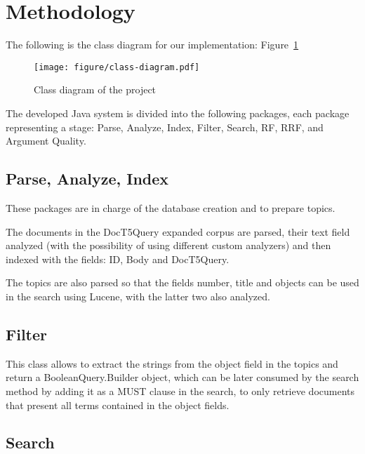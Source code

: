 \section{Methodology}
\label{sec:methodology}


The following is the class diagram for our implementation: Figure~\ref{fig:class-diagram}

\begin{figure}[h]
	\centering
	\texttt{[image: figure/class-diagram.pdf]}
	\caption{Class diagram of the project}
	\label{fig:class-diagram}
\end{figure}

The developed Java system is divided into the following packages, each package representing a stage: Parse, Analyze, Index, Filter, Search, RF, RRF, and Argument Quality.

\subsection{Parse, Analyze, Index}
\label{subsec:parse, analyze, index}
  
  These packages are in charge of the database creation and to prepare topics.
  
  The documents in the DocT5Query expanded corpus are parsed, their text field analyzed (with the possibility of using different custom analyzers) and then indexed with the fields: ID, Body and DocT5Query.
  
  The topics are also parsed so that the fields number, title and objects can be used in the search using Lucene, with the latter two also analyzed.
 
\subsection{Filter}

This class allows to extract the strings from the object field in the topics and return a BooleanQuery.Builder object, which can be later consumed by the search method by adding it as a MUST clause in the search, to only retrieve documents that present all terms contained in the object fields.

\subsection{Search}
\label{subsec:search}
  
